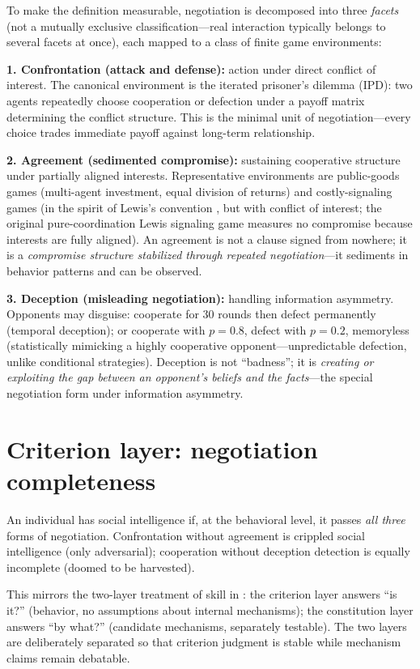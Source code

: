 \documentclass[11pt]{article}
\begin{document}
To make the definition measurable, negotiation is decomposed into three \emph{facets} (not a mutually exclusive classification---real interaction typically belongs to several facets at once), each mapped to a class of finite game environments:

\textbf{1. Confrontation (attack and defense):} action under direct conflict of interest. The canonical environment is the iterated prisoner's dilemma (IPD): two agents repeatedly choose cooperation or defection under a payoff matrix determining the conflict structure. This is the minimal unit of negotiation---every choice trades immediate payoff against long-term relationship.

\textbf{2. Agreement (sedimented compromise):} sustaining cooperative structure under partially aligned interests. Representative environments are public-goods games (multi-agent investment, equal division of returns) and costly-signaling games (in the spirit of Lewis's convention \cite{lewis1969}, but with conflict of interest; the original pure-coordination Lewis signaling game measures no compromise because interests are fully aligned). An agreement is not a clause signed from nowhere; it is a \emph{compromise structure stabilized through repeated negotiation}---it sediments in behavior patterns and can be observed.

\textbf{3. Deception (misleading negotiation):} handling information asymmetry. Opponents may disguise: cooperate for 30 rounds then defect permanently (temporal deception); or cooperate with $p=0.8$, defect with $p=0.2$, memoryless (statistically mimicking a highly cooperative opponent---unpredictable defection, unlike conditional strategies). Deception is not ``badness''; it is \emph{creating or exploiting the gap between an opponent's beliefs and the facts}---the special negotiation form under information asymmetry.

\section{Criterion layer: negotiation completeness}
\label{sec:criteria}

An individual has social intelligence if, at the behavioral level, it passes \emph{all three} forms of negotiation. Confrontation without agreement is crippled social intelligence (only adversarial); cooperation without deception detection is equally incomplete (doomed to be harvested).

This mirrors the two-layer treatment of skill in \cite{skilldef}: the criterion layer answers ``is it?'' (behavior, no assumptions about internal mechanisms); the constitution layer answers ``by what?'' (candidate mechanisms, separately testable). The two layers are deliberately separated so that criterion judgment is stable while mechanism claims remain debatable.
\end{document}
